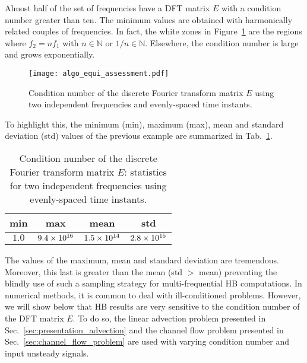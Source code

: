 Almost half of the set of frequencies have a DFT matrix $E$
with a condition number greater than ten.
The minimum values are obtained with harmonically related couples
of frequencies. In fact, the white zones in Figure~\ref{fig:algo_equi_assessment}
are the regions where $f_2 = n f_1$ with $n \in \mathbb{N}$ or $1/n \in \mathbb{N}$.
Elsewhere, the condition number is large and grows exponentially.
\begin{figure}[htp]
  \centering
  \texttt{[image: algo\_equi\_assessment.pdf]}
  \caption{Condition number of the discrete Fourier transform matrix $E$
  using two independent frequencies and evenly-spaced time instants.}
  \label{fig:algo_equi_assessment}
\end{figure}
To highlight this, the minimum (min), maximum (max), mean and 
standard deviation (std) values of the
previous example are summarized in Tab.~\ref{tab:hb_algo_equi}.
\begin{table}[htp]
  \centering
  \begin{tabular}{cccc}
    \toprule
    min & max & mean & std \\
    \midrule
    $1.0$ & $9.4\times 10^{16}$ & $1.5\times 10^{14}$ & $2.8\times 10^{15}$ \\
    \bottomrule
  \end{tabular}
  \caption{Condition number of the discrete Fourier transform matrix $E$: 
  statistics for two independent frequencies using evenly-spaced time instants.}
  \label{tab:hb_algo_equi}
\end{table}  
The values of the maximum, mean and standard deviation are tremendous.
Moreover, this last is greater than the mean
(std $ > $ mean) preventing the blindly use of such a sampling strategy for 
multi-frequential HB computations.
In numerical methods, it is common to deal with ill-conditioned
problems. However, we will show below that HB results are 
very sensitive to the condition number of the DFT matrix $E$.
To do so, the linear advection problem
presented in Sec.~\ref{sec:presentation_advection}
and the channel flow problem presented in 
Sec.~\ref{sec:channel_flow_problem}
are used with varying condition number and input unsteady signals.

